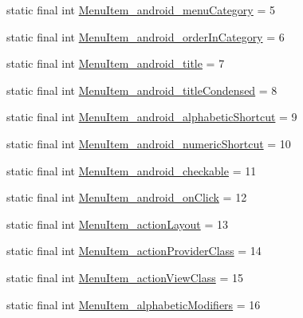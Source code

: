 \begin{DoxyCompactItemize}
\item 
static final int \mbox{\hyperlink{classandroid_1_1support_1_1v7_1_1appcompat_1_1R_1_1styleable_a90dc3836b837bb1b393f5442c2992692}{Menu\+Item\+\_\+android\+\_\+menu\+Category}} = 5
\item 
static final int \mbox{\hyperlink{classandroid_1_1support_1_1v7_1_1appcompat_1_1R_1_1styleable_aa1c0e909cd7ee99bf0a533a46cc1b7ea}{Menu\+Item\+\_\+android\+\_\+order\+In\+Category}} = 6
\item 
static final int \mbox{\hyperlink{classandroid_1_1support_1_1v7_1_1appcompat_1_1R_1_1styleable_ae43bb3bba8a786dc2a2b824328c9d870}{Menu\+Item\+\_\+android\+\_\+title}} = 7
\item 
static final int \mbox{\hyperlink{classandroid_1_1support_1_1v7_1_1appcompat_1_1R_1_1styleable_ada292a9182015c2384c05eec0475e10d}{Menu\+Item\+\_\+android\+\_\+title\+Condensed}} = 8
\item 
static final int \mbox{\hyperlink{classandroid_1_1support_1_1v7_1_1appcompat_1_1R_1_1styleable_a03463ef53f9db3bc022e6ec1a2b4dadb}{Menu\+Item\+\_\+android\+\_\+alphabetic\+Shortcut}} = 9
\item 
static final int \mbox{\hyperlink{classandroid_1_1support_1_1v7_1_1appcompat_1_1R_1_1styleable_a8bbbeb5f79fffd7b01e07b7c894d5566}{Menu\+Item\+\_\+android\+\_\+numeric\+Shortcut}} = 10
\item 
static final int \mbox{\hyperlink{classandroid_1_1support_1_1v7_1_1appcompat_1_1R_1_1styleable_a466b1e8d87b74e69f6b01a98d43e9d19}{Menu\+Item\+\_\+android\+\_\+checkable}} = 11
\item 
static final int \mbox{\hyperlink{classandroid_1_1support_1_1v7_1_1appcompat_1_1R_1_1styleable_a365df38239645b048e8c1defd7d07738}{Menu\+Item\+\_\+android\+\_\+on\+Click}} = 12
\item 
static final int \mbox{\hyperlink{classandroid_1_1support_1_1v7_1_1appcompat_1_1R_1_1styleable_a38b1a51cd51401648f537d796fb89f16}{Menu\+Item\+\_\+action\+Layout}} = 13
\item 
static final int \mbox{\hyperlink{classandroid_1_1support_1_1v7_1_1appcompat_1_1R_1_1styleable_a2adc6234d0c6d351271313030e3b817d}{Menu\+Item\+\_\+action\+Provider\+Class}} = 14
\item 
static final int \mbox{\hyperlink{classandroid_1_1support_1_1v7_1_1appcompat_1_1R_1_1styleable_a107c702447c8103b6cf1292a3ed39fa1}{Menu\+Item\+\_\+action\+View\+Class}} = 15
\item 
static final int \mbox{\hyperlink{classandroid_1_1support_1_1v7_1_1appcompat_1_1R_1_1styleable_aa351c5b8d264b3a5a72207cd1568bba6}{Menu\+Item\+\_\+alphabetic\+Modifiers}} = 16

\end{DoxyCompactItemize}
